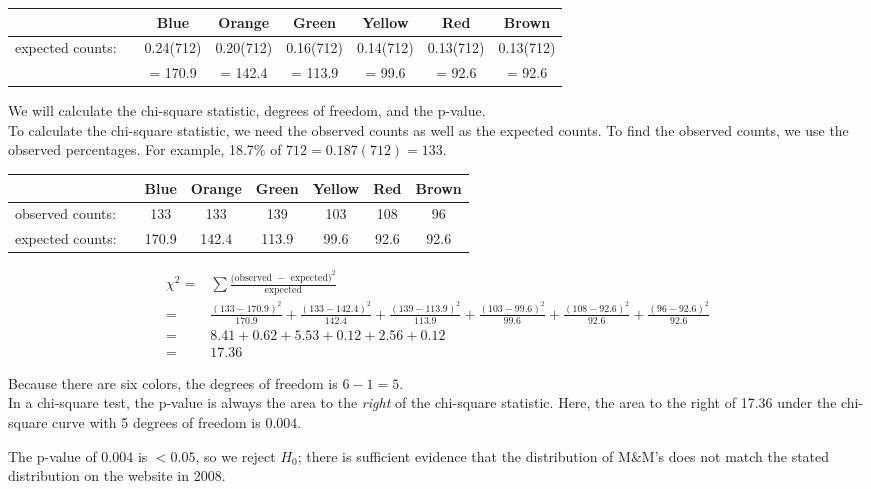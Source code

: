 \begin{examplewrap}
\begin{nexample}
\begin{description}
\begin{small}
\begin{tabular}{ll ccc ccc}
\hline
	 & \hspace{1mm} & Blue & Orange & Green & Yellow & Red & Brown\\
\hline
expected counts:&		& 0.24(712) &  0.20(712) & 0.16(712) & 0.14(712) & 0.13(712) & 0.13(712)  \\
&		& = 170.9 &  = 142.4 & = 113.9 & = 99.6 & = 92.6 & = 92.6\\ 
\hline
\end{tabular}
\end{small}

\item[ \inferencestep{Calculate} ]  We will calculate the chi-square statistic, degrees of freedom, and the p-value.\\
To calculate the chi-square statistic, we need the observed counts as well as the expected counts.  To find the observed counts, we use the observed percentages.  For example, 18.7\% of $712 = 0.187(712)=133$.

\begin{center}
\begin{small}
\begin{tabular}{ll ccc ccc}
\hline
	 & \hspace{1mm} & Blue & Orange & Green & Yellow & Red & Brown\\
\hline
observed counts:&		& 133 & 133 & 139 & 103 & 108 & 96  \\
expected counts:&		& 170.9 &  142.4 & 113.9 & 99.6 & 92.6 & 92.6\\
\hline
\end{tabular}
\end{small}
\end{center}
\begin{small}
\begin{align*}
\chi^2 =&\sum{ \frac{\text{(observed } - \text{ expected})^2}{\text{expected}}}\\
=& \frac{(133 - 170.9)^2}{170.9}+\frac{(133 - 142.4)^2}{142.4}+\frac{(139 - 113.9)^2}{113.9}+\frac{(103 - 99.6)^2}{99.6}+\frac{(108 - 92.6)^2}{92.6}+\frac{(96 - 92.6)^2}{92.6}\\
=&8.41+0.62+5.53+0.12+2.56+0.12\\
=&17.36
\end{align*}
\end{small}

Because there are six colors, the degrees of freedom is $6-1=5$.
\\In a chi-square test, the p-value is always the area to the \emph{right} of the chi-square statistic.  Here, the area to the right of 17.36 under the chi-square curve with 5 degrees of freedom is $0.004$.  
\item[\inferencestep{Conclude}]  The p-value of 0.004 is $< 0.05$, so we reject $H_0$; there is sufficient evidence that the distribution of M\&M's does not match the stated distribution on the website in 2008.  
\end{description}
\end{nexample}
\end{examplewrap}

